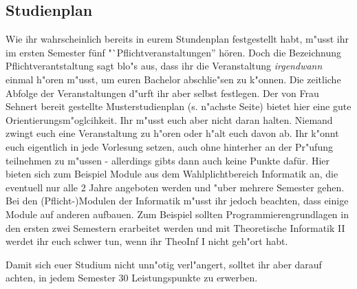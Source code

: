 \subsection{Studienplan}
\label{bach_studienplan}
Wie ihr wahrscheinlich bereits in eurem Stundenplan festgestellt habt, m"usst ihr im ersten Semester fünf "`Pflichtveranstaltungen'' hören.
Doch die Bezeichnung Pflichtverantstaltung sagt blo"s aus, dass ihr die Veranstaltung \emph{irgendwann} einmal h"oren m"usst, um euren Bachelor abschlie"sen zu k"onnen.
Die zeitliche Abfolge der Veranstaltungen d"urft ihr aber selbst festlegen.
Der von Frau Sehnert bereit gestellte Musterstudienplan (s. n"achste Seite) bietet hier eine gute Orientierungsm"oglcihkeit.
Ihr m"usst euch aber nicht daran halten. Niemand zwingt euch eine Veranstaltung zu h"oren oder h"alt euch davon ab.
Ihr k"onnt euch eigentlich in jede Vorlesung setzen, auch ohne hinterher an der Pr"ufung teilnehmen zu m"ussen - allerdings gibts dann auch keine Punkte dafür.
Hier bieten sich zum Beispiel Module aus dem Wahlplichtbereich Informatik an, die eventuell nur alle 2 Jahre angeboten werden und "uber mehrere Semester gehen.
Bei den (Pflicht-)Modulen der Informatik m"usst ihr jedoch beachten, dass einige Module auf anderen aufbauen.
Zum Beispiel sollten Programmierengrundlagen in den ersten zwei Semestern erarbeitet werden und mit Theoretische Informatik II werdet ihr euch schwer tun, wenn ihr TheoInf I nicht geh"ort habt.

Damit sich euer Studium nicht unn"otig verl"angert, solltet ihr aber darauf achten, in jedem Semester 30 Leistungspunkte zu erwerben. 






